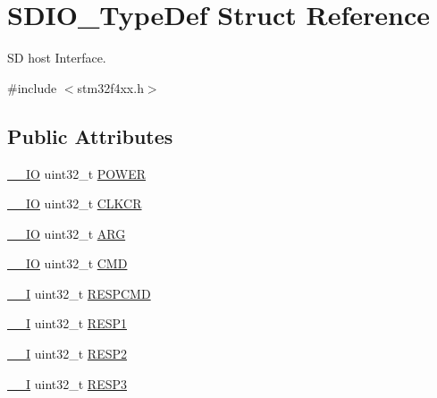 \hypertarget{struct_s_d_i_o___type_def}{}\section{S\+D\+I\+O\+\_\+\+Type\+Def Struct Reference}
\label{struct_s_d_i_o___type_def}


SD host Interface.  




{\ttfamily \#include $<$stm32f4xx.\+h$>$}

\subsection*{Public Attributes}
\begin{DoxyCompactItemize}
\item 
\hyperlink{core__cm4_8h_aec43007d9998a0a0e01faede4133d6be}{\+\_\+\+\_\+\+IO} uint32\+\_\+t \hyperlink{struct_s_d_i_o___type_def_a7c156bc55f6d970a846a459d57a9e940}{P\+O\+W\+ER}
\item 
\hyperlink{core__cm4_8h_aec43007d9998a0a0e01faede4133d6be}{\+\_\+\+\_\+\+IO} uint32\+\_\+t \hyperlink{struct_s_d_i_o___type_def_aeb1e30ce2038628e45264f75e5e926bb}{C\+L\+K\+CR}
\item 
\hyperlink{core__cm4_8h_aec43007d9998a0a0e01faede4133d6be}{\+\_\+\+\_\+\+IO} uint32\+\_\+t \hyperlink{struct_s_d_i_o___type_def_a3e24392875e98cd09043e54a0990ab7a}{A\+RG}
\item 
\hyperlink{core__cm4_8h_aec43007d9998a0a0e01faede4133d6be}{\+\_\+\+\_\+\+IO} uint32\+\_\+t \hyperlink{struct_s_d_i_o___type_def_abbbdc3174e12dab21123d746d65f345d}{C\+MD}
\item 
\hyperlink{core__cm4_8h_af63697ed9952cc71e1225efe205f6cd3}{\+\_\+\+\_\+I} uint32\+\_\+t \hyperlink{struct_s_d_i_o___type_def_a9d881ed6c2fdecf77e872bcc6b404774}{R\+E\+S\+P\+C\+MD}
\item 
\hyperlink{core__cm4_8h_af63697ed9952cc71e1225efe205f6cd3}{\+\_\+\+\_\+I} uint32\+\_\+t \hyperlink{struct_s_d_i_o___type_def_a2b6f1ca5a5a50f8ef5417fe7be22553c}{R\+E\+S\+P1}
\item 
\hyperlink{core__cm4_8h_af63697ed9952cc71e1225efe205f6cd3}{\+\_\+\+\_\+I} uint32\+\_\+t \hyperlink{struct_s_d_i_o___type_def_a9228c8a38c07c508373644220dd322f0}{R\+E\+S\+P2}
\item 
\hyperlink{core__cm4_8h_af63697ed9952cc71e1225efe205f6cd3}{\+\_\+\+\_\+I} uint32\+\_\+t \hyperlink{struct_s_d_i_o___type_def_a70f3e911570bd326bff852664fd8a7d5}{R\+E\+S\+P3}

\end{DoxyCompactItemize}
